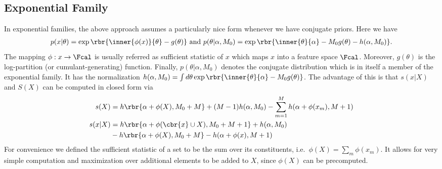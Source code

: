 \documentclass{article}
\begin{document}
\subsection{Exponential Family}
\label{sec:family}
In exponential families, the above approach assumes a particularly nice form whenever we have conjugate priors. Here we have
\begin{align}
  p(x|\theta) = \exp\rbr{\inner{\phi(x)}{\theta} - g(\theta)}
  \text{ and }
  p(\theta|\alpha, M_0) = \exp\rbr{\inner{\theta}{\alpha} - M_0
  g(\theta)- h(\alpha, M_0)}.
\end{align}
The mapping $\phi: x \to \Fcal$ is usually referred as sufficient statistic of $x$ which maps $x$ into a feature space $\Fcal$. Moreover, $g(\theta)$ is the log-partition (or cumulant-generating) function. Finally, $p(\theta|\alpha,M_0)$ denotes the conjugate distribution which is in itself a member of the exponential family. It has the normalization $h(\alpha,M_0) = \int d\theta \exp\rbr{\inner{\theta}{\alpha} - M_0 g(\theta)}$. The advantage of this is that $s(x|X)$ and $S(X)$ can be computed in closed form \cite{ghahramani2005bayesian} via
\begin{align}
  s(X) & = h\rbr{\alpha + \phi(X), M_0 + M} + (M-1) h(\alpha,
  M_0) - \sum_{m=1}^M h(\alpha + \phi(x_m), M + 1)\\
  s(x|X) & = h\rbr{\alpha + \phi(\cbr{x} \cup X), M_0 + M
           + 1}+ h(\alpha, M_0) 
      \label{eq:relativescore} \\
  & - h\rbr{\alpha + \phi(X), M_0 + M} - h(\alpha + \phi(x), M + 1)
    \nonumber
\end{align}
For convenience we defined the sufficient statistic of a set to be the sum over its constituents, i.e.\ $\phi(X) = \sum_m \phi(x_m)$. It allows for very simple computation and maximization over additional elements to be added to $X$, since $\phi(X)$ can be precomputed. 
\end{document}
